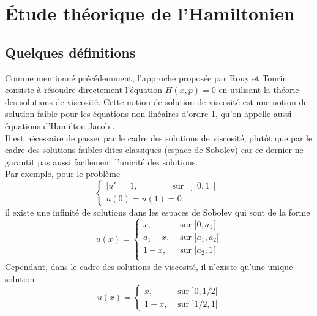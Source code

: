 \section{Étude théorique de l'Hamiltonien}
\subsection{Quelques définitions}

Comme mentionné précédemment, l’approche proposée par Rouy et Tourin consiste à résoudre directement l’équation $H(x,p)=0$ en utilisant la théorie des solutions de viscosité. Cette notion de solution de viscosité est une notion de solution faible pour les équations non linéaires d'ordre 1, qu'on appelle aussi équations d'Hamilton-Jacobi. \\

Il est nécessaire de passer par le cadre des solutions de viscosité, plutôt que par le cadre des solutions faibles dites \og classiques\fg{} (espace de Sobolev) car ce dernier ne garantit pas aussi facilement l'unicité des solutions.\\

Par exemple, pour le problème
\begin{equation*}
    \begin{cases}
        |u'|=1, \qquad\qquad\text{sur } \left]0,1\right[\\
        u(0)=u(1)=0
    \end{cases}
\end{equation*}
il existe une infinité de solutions dans les espaces de Sobolev qui sont de la forme
\begin{equation*}
    u(x)=\begin{cases}
        x, &\text{ sur } ]0,a_1[\\
        a_1-x, &\text{ sur } ]a_1,a_2[\\
        1-x, &\text{ sur } ]a_2,1[\\
    \end{cases}
\end{equation*}
Cependant, dans le cadre des solutions de viscosité, il n'existe qu'une unique solution
\begin{equation*}
    u(x)=\begin{cases}
        x, &\text{ sur } ]0,1/2[\\
        1-x, &\text{ sur } ]1/2,1[
    \end{cases}
\end{equation*}

